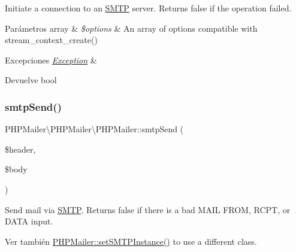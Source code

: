 Initiate a connection to an \hyperlink{classPHPMailer_1_1PHPMailer_1_1SMTP}{S\+M\+TP} server. Returns false if the operation failed.


\begin{DoxyParams}[1]{Parámetros}
array & {\em \$options} & An array of options compatible with stream\+\_\+context\+\_\+create()\\
\hline
\end{DoxyParams}

\begin{DoxyExceptions}{Excepciones}
{\em \hyperlink{classPHPMailer_1_1PHPMailer_1_1Exception}{Exception}} & \\
\hline
\end{DoxyExceptions}
\begin{DoxyReturn}{Devuelve}
bool 
\end{DoxyReturn}
\mbox{\label{classPHPMailer_1_1PHPMailer_1_1PHPMailer_a16204aee570cc970cb6d1a68202dfbe2}} 
\subsubsection{\texorpdfstring{smtp\+Send()}{smtpSend()}}
{\footnotesize\ttfamily P\+H\+P\+Mailer\textbackslash{}\+P\+H\+P\+Mailer\textbackslash{}\+P\+H\+P\+Mailer\+::smtp\+Send (\begin{DoxyParamCaption}\item[{}]{\$header,  }\item[{}]{\$body }\end{DoxyParamCaption})\hspace{0.3cm}{\ttfamily [protected]}}

Send mail via \hyperlink{classPHPMailer_1_1PHPMailer_1_1SMTP}{S\+M\+TP}. Returns false if there is a bad M\+A\+IL F\+R\+OM, R\+C\+PT, or D\+A\+TA input.

\begin{DoxySeeAlso}{Ver también}
\hyperlink{classPHPMailer_1_1PHPMailer_1_1PHPMailer_a15b28dbe8be012f10d2f2207f1d2e666}{P\+H\+P\+Mailer\+::set\+S\+M\+T\+P\+Instance()} to use a different class.
\end{DoxySeeAlso}



